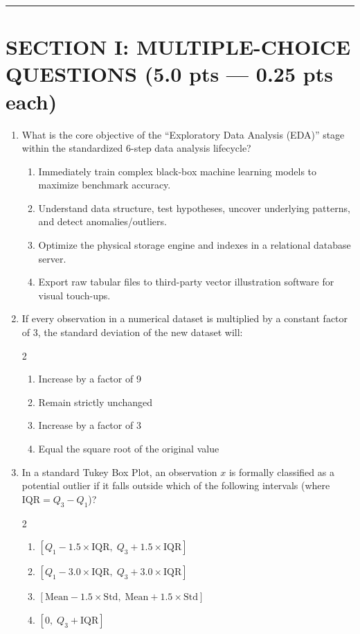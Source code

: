 \documentclass[11pt,a4paper]{article}
\begin{document}
\vspace{-3mm}
\hrule
\vspace{1.5mm}

\section*{SECTION I: MULTIPLE-CHOICE QUESTIONS (5.0 pts --- 0.25 pts each)}

\begin{enumerate}[leftmargin=*,itemsep=2pt]

\item What is the core objective of the ``Exploratory Data Analysis (EDA)'' stage within the standardized 6-step data analysis lifecycle?
\begin{enumerate}[label=\Alph*.]
  \item Immediately train complex black-box machine learning models to maximize benchmark accuracy.
  \item Understand data structure, test hypotheses, uncover underlying patterns, and detect anomalies/outliers.
  \item Optimize the physical storage engine and indexes in a relational database server.
  \item Export raw tabular files to third-party vector illustration software for visual touch-ups.
\end{enumerate}

\item If every observation in a numerical dataset is multiplied by a constant factor of 3, the standard deviation of the new dataset will:
\begin{multicols}{2}
\begin{enumerate}[label=\Alph*.]
  \item Increase by a factor of 9
  \item Remain strictly unchanged
  \item Increase by a factor of 3
  \item Equal the square root of the original value
\end{enumerate}
\end{multicols}

\item In a standard Tukey Box Plot, an observation $x$ is formally classified as a potential outlier if it falls outside which of the following intervals (where $\text{IQR} = Q_3 - Q_1$)?
\begin{multicols}{2}
\begin{enumerate}[label=\Alph*.]
  \item $[Q_1 - 1.5\times\text{IQR}, \; Q_3 + 1.5\times\text{IQR}]$
  \item $[Q_1 - 3.0\times\text{IQR}, \; Q_3 + 3.0\times\text{IQR}]$
  \item $[\text{Mean} - 1.5\times\text{Std}, \; \text{Mean} + 1.5\times\text{Std}]$
  \item $[0, \; Q_3 + \text{IQR}]$
\end{enumerate}
\end{multicols}


\end{enumerate}
\end{document}

